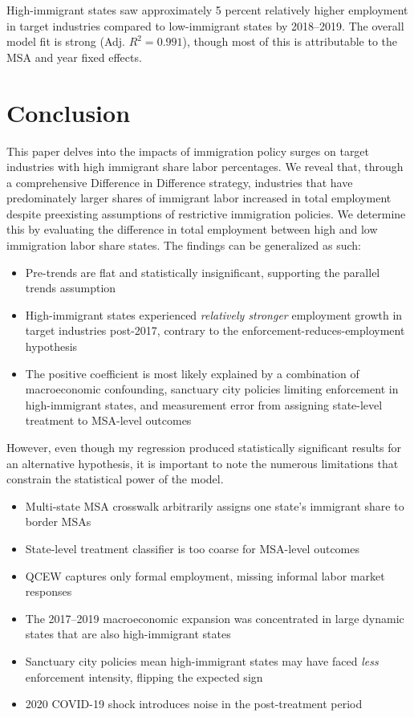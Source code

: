 \documentclass[12pt]{article}
\begin{document}
High-immigrant states saw approximately 5 percent relatively higher
employment in target industries compared to low-immigrant states by
2018--2019. The overall model fit is strong (Adj. $R^2 = 0.991$),
though most of this is attributable to the MSA and year fixed effects.
 

\section{Conclusion}

 
This paper delves into the impacts of immigration policy surges on target industries with high immigrant share labor percentages. We reveal that, through a comprehensive Difference in Difference strategy,  industries that have predominately larger shares of immigrant labor increased in total employment despite preexisting assumptions of restrictive immigration policies. We determine this by evaluating the difference in total employment between high and low immigration labor share states. The findings can be generalized as such: 
 
\begin{itemize}
    \item Pre-trends are flat and statistically insignificant, supporting
          the parallel trends assumption
    \item High-immigrant states experienced \textit{relatively stronger}
          employment growth in target industries post-2017, contrary to
          the enforcement-reduces-employment hypothesis
    \item The positive coefficient is most likely explained by a
          combination of macroeconomic confounding, sanctuary city
          policies limiting enforcement in high-immigrant states, and
          measurement error from assigning state-level treatment to
          MSA-level outcomes
\end{itemize}
 
However, even though my regression produced statistically significant results for an alternative hypothesis, it is important to note the numerous limitations that constrain the statistical power of the model.

\begin{itemize}
    \item Multi-state MSA crosswalk arbitrarily assigns one state's
          immigrant share to border MSAs
    \item State-level treatment classifier is too coarse for MSA-level
          outcomes
    \item QCEW captures only formal employment, missing informal labor
          market responses
    \item The 2017--2019 macroeconomic expansion was concentrated in
          large dynamic states that are also high-immigrant states
    \item Sanctuary city policies mean high-immigrant states may have
          faced \textit{less} enforcement intensity, flipping the
          expected sign
    \item 2020 COVID-19 shock introduces noise in the post-treatment
          period
\end{itemize}
\end{document}
